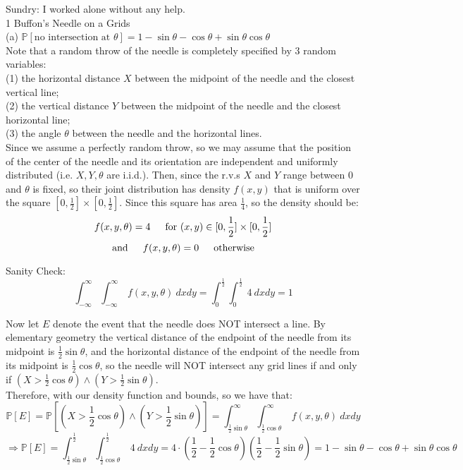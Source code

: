 \documentclass{article}
\begin{document}
Sundry: I worked alone without any help. \\[1cm]
{\Large 1 Buffon’s Needle on a Grids} \\[.5cm]
{\color{red} (a)
$\mathbb{P}[\text{no intersection at } \theta] =
1 - \sin\theta - \cos\theta + \sin\theta\cos\theta$} \\

Note that a random throw of the needle is completely specified by 3 random variables: \\[.1cm]
(1) the horizontal distance $X$ between the midpoint of the needle and the closest vertical line; \\[.1cm]
(2) the vertical distance $Y$ between the midpoint of the needle and the closest horizontal line; \\[.1cm]
(3) the angle $\theta$ between the needle and the horizontal lines. \\

Since we assume a perfectly random throw, so we may assume that the position of the center of the needle and its orientation are independent and uniformly distributed (i.e. $X,Y,\theta$ are i.i.d.).
Then, since the r.v.s $X$ and $Y$ range between 0 and $\theta$ is fixed, so their joint distribution has density $f(x,y)$ that is uniform over the square $[0,\frac{1}{2}] \times [0,\frac{1}{2}]$.
Since this square has area $\frac{1}{4}$, so the density should be:
$$f(x,y,\theta) = 4 \indent \text{for } (x,y)\in [0,\frac{1}{2}] \times [0,\frac{1}{2}]$$
$$\text{and}\indent f(x,y,\theta) = 0 \indent \text{otherwise}$$

Sanity Check:
$$\int_{-\infty}^\infty
	\int_{-\infty}^\infty\ f(x,y,\theta)\ dxdy =
\int_{0}^\frac{1}{2}
	\int_{0}^\frac{1}{2}\ 4\ dxdy = 1
$$

Now let $E$ denote the event that the needle does NOT intersect a line. By elementary geometry the vertical distance of the endpoint of the needle from its midpoint is $\frac{1}{2}\sin\theta$, and the horizontal distance of the endpoint of the needle from its midpoint is $\frac{1}{2}\cos\theta$, so the needle will NOT intersect any grid lines if and only if $(X > \frac{1}{2}\cos\theta) \land (Y > \frac{1}{2}\sin\theta)$. \\

Therefore, with our density function and bounds, so we have that:
$$\mathbb{P}[E] =
\mathbb{P}[(X > \frac{1}{2}\cos\theta) \land (Y > \frac{1}{2}\sin\theta)] =
\int_{\frac{1}{2}\sin\theta}^\infty
	\int_{\frac{1}{2}\cos\theta}^\infty\
		f(x,y,\theta)\ dxdy$$
$$\Longrightarrow \mathbb{P}[E] =
\int_{\frac{1}{2}\sin\theta}^\frac{1}{2}
	\int_{\frac{1}{2}\cos\theta}^\frac{1}{2}\
		4\ dxdy =
4\cdot
	(\frac{1}{2} - \frac{1}{2}\cos\theta)
		(\frac{1}{2} - \frac{1}{2}\sin\theta) =
1 - \sin\theta - \cos\theta + \sin\theta\cos\theta
$$ \\
\end{document}
